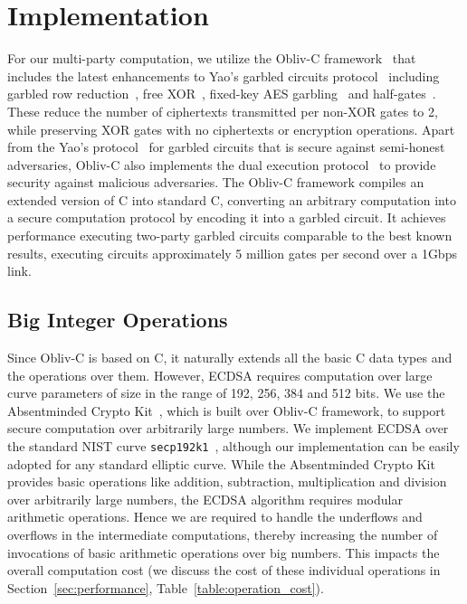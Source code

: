 \section{Implementation}\label{sec:implementation}

For our multi-party computation, we utilize the Obliv-C framework~\cite{cryptoeprint:2015:1153} that includes the latest enhancements to Yao's garbled circuits protocol~\cite{yao1986generate} including garbled row reduction~\cite{naor1999privacy, pinkas2009secure}, free XOR~\cite{kolesnikov2008improved}, fixed-key AES garbling~\cite{bellare2013efficient} and half-gates~\cite{zahur2015two}. These reduce the number of ciphertexts transmitted per non-XOR gates to 2, while preserving XOR gates with no ciphertexts or encryption operations. Apart from the Yao's protocol~\cite{yao1982protocols, yao1986generate} for garbled circuits that is secure against semi-honest adversaries, Obliv-C also implements the dual execution protocol~\cite{huang2012quid} to provide security against malicious adversaries. The Obliv-C framework compiles an extended version of C into standard C, converting an arbitrary computation into a secure computation protocol by encoding it into a garbled circuit. It achieves performance executing two-party garbled circuits comparable to the best known results, executing circuits approximately 5 million gates per second over a 1Gbps link. 

\subsection{Big Integer Operations}

Since Obliv-C is based on C, it naturally extends all the basic C data types and the operations over them. However, ECDSA requires computation over large curve parameters of size in the range of 192, 256, 384 and 512 bits. We use the Absentminded Crypto Kit~\cite{absentminded_crypto_kit}, which is built over Obliv-C framework, to support secure computation over arbitrarily large numbers. We implement ECDSA over the standard NIST curve \texttt{secp192k1}~\cite{elliptic_curve_domain_parameters}, although our implementation can be easily adopted for any standard elliptic curve. While the Absentminded Crypto Kit provides basic operations like addition, subtraction, multiplication and division over arbitrarily large numbers, the ECDSA algorithm requires modular arithmetic operations. Hence we are required to handle the underflows and overflows in the intermediate computations, thereby increasing the number of invocations of basic arithmetic operations over big numbers. This impacts the overall computation cost (we discuss the cost of these individual operations in Section~\ref{sec:performance}, Table~\ref{table:operation_cost}).



